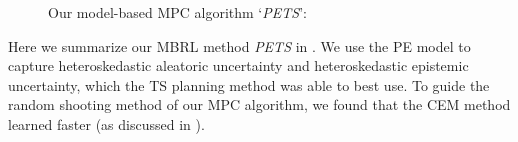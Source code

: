 %
 \begin{figure}
 \vspace{-25pt}
 \begin{minipage}{\linewidth}
      \begin{algorithm}[H]
\small
\begin{algorithmic}[1]
\renewcommand{\algorithmicrequire}{\textbf{Input:}}
\renewcommand{\algorithmicensure}{\textbf{Output:}}
 \ENDFOR
 \ENDFOR
 \ENDFOR
\end{algorithmic}
\caption{Our model-based MPC algorithm `\textit{PETS}':}
\label{alg:ourmethod}
\end{algorithm}
\end{minipage}
\end{figure}
%
Here we summarize our MBRL method \textit{PETS} in .
We use the PE model to capture heteroskedastic aleatoric uncertainty and heteroskedastic epistemic uncertainty, 
which the TS planning method was able to best use.
To guide the random shooting method of our MPC algorithm, we found that the CEM method learned faster (as discussed in ).
